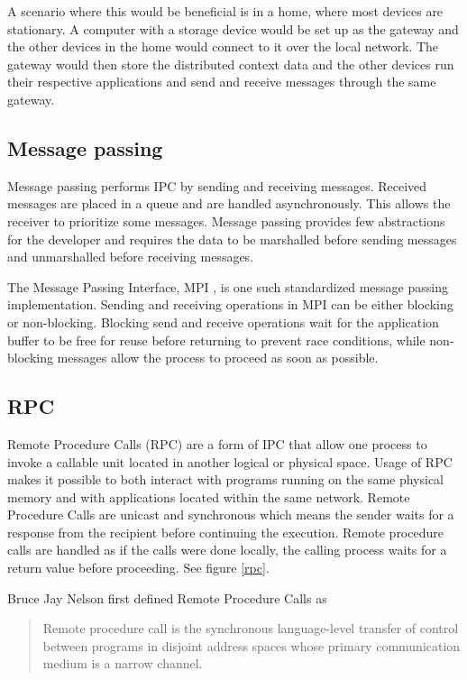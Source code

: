A scenario where this would be beneficial is in a home, where most devices are stationary. A computer with a storage device would be set up as the gateway and the other devices in the home would connect to it over the local network. The gateway would then store the distributed context data and the other devices run their respective applications and send and receive messages through the same gateway.

\subsection{Message passing}
Message passing performs IPC by sending and receiving messages. Received messages are placed in a queue and are handled asynchronously. This allows the receiver to prioritize some messages. Message passing provides few abstractions for the developer and requires the data to be marshalled before sending messages and unmarshalled before receiving messages.

The Message Passing Interface, MPI \cite{mpi3stand}, is one such standardized message passing implementation. Sending and receiving operations in MPI can be either blocking or non-blocking. Blocking send and receive operations wait for the application buffer to be free for reuse before returning to prevent race conditions, while non-blocking messages allow the process to proceed as soon as possible.

\subsection{RPC}
Remote Procedure Calls (RPC) are a form of IPC that allow one process to invoke a callable unit \cite{Eac} located in another logical or physical space. Usage of RPC makes it possible to both interact with programs running on the same physical memory and with applications located within the same network.
Remote Procedure Calls are unicast and synchronous which means the sender waits for a response from the recipient before continuing the execution. Remote procedure calls are handled as if the calls were done locally, the calling process waits for a return value before proceeding. See figure \ref{rpc}.

Bruce Jay Nelson first defined Remote Procedure Calls as
\begin{quotation}
Remote procedure call is the synchronous language-level transfer of control between programs in disjoint address spaces whose primary communication medium is a narrow channel. \cite{Nelson:1981:RPC:910306}
\end{quotation}

